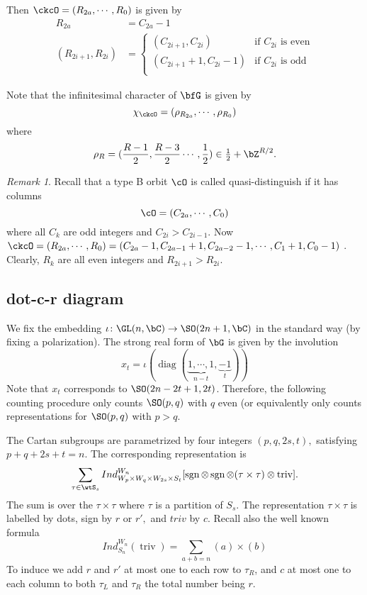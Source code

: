 \documentclass[12pt,a4paper]{amsart}
\newcommand{\diag}{\operatorname{diag}}
\newcommand{\sgn}{\operatorname{sgn}}
\newcommand{\triv}{\operatorname{triv}}
\numberwithin{equation}{section}
\theoremstyle{remark}
\newtheorem*{remark}{Remark}
\def\half{{\tfrac{1}{2}}}
\begin{document}
Then $\ckcO = (R_{2a}, \cdots, R_0)$ is given by
\[
  \begin{split}
    R_{2a} &  = C_{2a}-1\\
    (R_{2i+1}, R_{2i}) & =
    \begin{cases}
      (C_{2i+1},C_{2i}) & \text{if } C_{2i} \text{ is even}\\
      (C_{2i+1}+1,C_{2i}-1) & \text{if } C_{2i} \text{ is odd}\\
    \end{cases}
  \end{split} 
\]

Note that the infinitesimal character of $\bfG$ is given by
\[
  \chi_\ckcO = (\rho_{R_{2a}}, \cdots, \rho_{R_0})
\]
where
\[
  \rho_{R} = (\frac{R-1}{2},\frac{R-3}{2}\cdots, \frac{1}{2})\in \half + \bZ^{R/2}.
\]


\begin{remark}
  Recall that a type B orbit $\cO$ is called quasi-distinguish if it has columns
  \[
    \cO = (C_{2a}, \cdots, C_{0})
  \]
  where all $C_k$ are odd integers and $C_{2i} > C_{2i-1}$.  Now
  $\ckcO = (R_{2a}, \cdots, R_0) = (C_{2a}-1, C_{2a-1}+1, C_{2a-2}-1, \cdots,
  C_1+1, C_0-1)$ .
  Clearly, $R_{k}$ are all even integers and $R_{2i+1}>R_{2i}$.
\end{remark}

\subsection{dot-c-r diagram}
We fix the embedding $\iota \colon \GL(n,\bC)\rightarrow \SO(2n+1,\bC)$ in the
standard way (by fixing a polarization).  The strong real form of $\bG$ is given
by the involution
\[
  x_{t} = \iota(\diag(\underbrace{1,\cdots, 1}_{n-t},\underbrace{-1}_{t}))
\]
Note that $x_{t}$ corresponds to $\SO(2n-2t+1, 2t)$.
Therefore, the following counting procedure only counts $\SO(p,q)$ with $q$
even (or equivalently only counts representations for $\SO(p,q)$ with $p>q$.  


The Cartan subgroups are parametrized by
four integers $(p,q,2s,t),$ satisfying $p+q+2s+t=n.$ The corresponding
representation is 
\begin{equation} \label{eq:CC.B}
\sum_{\tau\in\wtS_s}Ind_{W_p\times W_q\times W_{2s}\times S_t}^{W_n}
[\sgn\otimes \sgn\otimes(\tau\times \tau)\otimes \triv].
\end{equation}
The sum is over the $\tau\times\tau$ where $\tau$ is a partition
of $S_s$.
The representation $\tau\times \tau$ is labelled by dots, sign by $r$ or $r',$ and $triv$
by $c$. Recall also the well known formula
\begin{equation}
Ind_{S_n}^{W_n}(\triv)=\sum_{a+b=n} (a)\times(b)
\label{2.1.1}\end{equation}
To induce we add $r$ and $r'$ at most one to each row to $\tau_R$, and
$c$ at most one to each column to both $\tau_L$ and $\tau_R$ the total
number being $r$.
\end{document}
